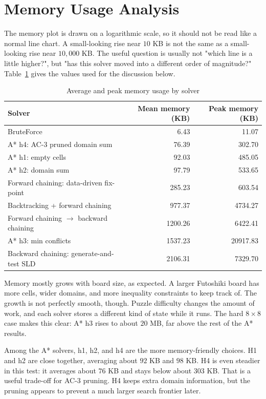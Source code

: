 \section{Memory Usage Analysis}
\label{sec:memory_usage_analysis}

The memory plot is drawn on a logarithmic scale, so it should not be read like a
normal line chart. A small-looking rise near \(10\) KB is not the same as a
small-looking rise near \(10{,}000\) KB. The useful question is usually not
"which line is a little higher?", but "has this solver moved into a different
order of magnitude?" Table~\ref{tab:memory_usage_summary} gives the values used
for the discussion below.

\begin{table}[htbp]
  \centering
  \caption{Average and peak memory usage by solver}
  \label{tab:memory_usage_summary}
  \begin{tabular}{lrr}
    \toprule
    Solver & Mean memory (KB) & Peak memory (KB) \\
    \midrule
    BruteForce & 6.43 & 11.07 \\
    A* h4: AC-3 pruned domain sum & 76.39 & 302.70 \\
    A* h1: empty cells & 92.03 & 485.05 \\
    A* h2: domain sum & 97.79 & 533.65 \\
    Forward chaining: data-driven fix-point & 285.23 & 603.54 \\
    Backtracking + forward chaining & 977.37 & 4734.27 \\
    Forward chaining \(\rightarrow\) backward chaining & 1200.26 & 6422.41 \\
    A* h3: min conflicts & 1537.23 & 20917.83 \\
    Backward chaining: generate-and-test SLD & 2106.31 & 7329.70 \\
    \bottomrule
  \end{tabular}
\end{table}

Memory mostly grows with board size, as expected. A larger Futoshiki board has
more cells, wider domains, and more inequality constraints to keep track of. The
growth is not perfectly smooth, though. Puzzle difficulty changes the amount of
work, and each solver stores a different kind of state while it runs. The hard
\(8 \times 8\) case makes this clear: A* h3 rises to about \(20\) MB, far above
the rest of the A* results.

Among the A* solvers, h1, h2, and h4 are the more memory-friendly choices. H1
and h2 are close together, averaging about \(92\) KB and \(98\) KB. H4 is even
steadier in this test: it averages about \(76\) KB and stays below about
\(303\) KB. That is a useful trade-off for AC-3 pruning. H4 keeps extra domain
information, but the pruning appears to prevent a much larger search frontier
later.

